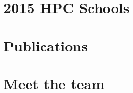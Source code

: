 \documentclass{article}
\begin{document}

\newpage
\section{\faCalendar\ 2015 HPC Schools}



\section{\faFileAlt\ Publications}




\clearpage
\section{\faUser\ Meet the team}





% 

\end{document}
